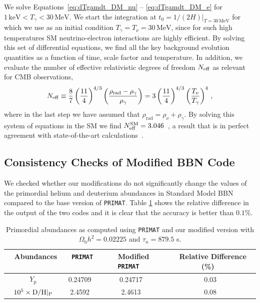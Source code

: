 We solve Equations~\eqref{eq:dTgamdt_DM_nu} -- \eqref{eq:dTgamdt_DM_e} for $1\,\text{keV} < T_\gamma < 30\,\text{MeV}$. We start the integration at $t_0 = 1/(2 H)|_{T = 30\,\text{MeV}}$ for which we use as an initial condition $T_\gamma = T_\nu = 30 \,\text{MeV}$, since for such high temperatures SM neutrino-electron interactions are highly efficient. By solving this set of differential equations, we find all the key background evolution quantities as a function of time, scale factor and temperature. In addition, we evaluate the number of effective relativistic degrees of freedom $N_{\rm eff}$ as relevant for CMB observations,
\begin{align}\label{eq:Neff}
N_{\rm eff} \equiv \frac{8}{7}\left(\frac{11}{4} \right)^{4/3} \left( \frac{\rho_{\text{rad}}-\rho_\gamma}{\rho_\gamma}\right) = 3 \left(\frac{11}{4} \right)^{4/3} \left(\frac{T_\nu}{T_\gamma}\right)^4 \, ,
\end{align} 
where in the last step we have assumed that $\rho_{\text{rad}} = \rho_\nu + \rho_\gamma$. By solving this system of equations in the SM we find $N_{\rm eff}^{\rm SM} = 3.046$~\cite{Escudero:2019new}, a result that is in perfect agreement with state-of-the-art calculations~\cite{Mangano:2005cc,deSalas:2016ztq}.  

\subsection{Consistency Checks of Modified BBN Code}\label{app:ConsistencyChecks}\vspace{-0.2cm}
We checked whether our modifications do not significantly change the values of the primordial helium and deuterium abundances in Standard Model BBN compared to the base version of \texttt{PRIMAT}. Table \ref{tab:SBBNcheck} shows the relative difference in the output of the two codes and it is clear that the accuracy is better than $0.1\%$.
\begin{table}[h]
    \centering
    {\def\arraystretch{1.35}
    \begin{tabular}{c|c|c|c}
        \toprule
      $\,\,$   \textbf{Abundances} $\,\,$ & $\,\,$ \texttt{PRIMAT}$\,\,$ & $\,\,$ \textbf{Modified} \texttt{PRIMAT} $\,\,$ & $\,\,$ \textbf{Relative Difference (\%)} $\,\,$ \\
        \hline\hline
        $Y_{\mathrm{p}}$ & 0.24709 & 0.24717 & 0.03\\
        $10^5\times {\rm D/H}|_{\rm P}$ & 2.4592 & 2.4613 & 0.08 \\ \hline  \hline
    \end{tabular}}\vspace{-0.1cm}
    \caption{Primordial abundances as computed using \texttt{PRIMAT} and our modified version with $\Omega_{\mathrm{b}} h^2 = 0.02225$ and $\tau_n = 879.5$ s.}
    \label{tab:SBBNcheck}
\end{table} 
\vspace{-0.5cm}

